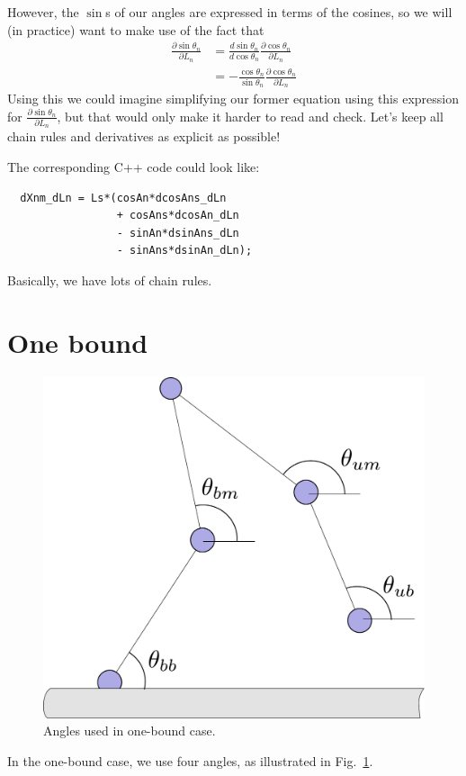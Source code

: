 \documentclass[11pt,twocolumn]{article}
\begin{document}
However, the $\sin$s of our angles are expressed in terms of the
cosines, so we will (in practice) want to make use of the fact that
\begin{align}
  \frac{\partial \sin\theta_{n}}{\partial L_n} &=
  \frac{d \sin\theta_{n}}{d \cos\theta_n}
  \frac{\partial \cos\theta_{n}}{\partial L_n} \\
  &=
  -\frac{\cos\theta_{n}}{\sin\theta_n}
  \frac{\partial \cos\theta_{n}}{\partial L_n}
\end{align}
Using this we could imagine simplifying our former equation using this
expression for $\frac{\partial \sin\theta_{n}}{\partial L_n}$, but
that would only make it harder to read and check.  Let's keep all
chain rules and derivatives as explicit as possible!

The
corresponding C++ code could look like:
\begin{verbatim}
  dXnm_dLn = Ls*(cosAn*dcosAns_dLn
                 + cosAns*dcosAn_dLn
                 - sinAn*dsinAns_dLn
                 - sinAns*dsinAn_dLn);
\end{verbatim}
Basically, we have lots of chain rules.

\section{One bound}

\begin{figure}
  \includegraphics[width=\columnwidth]{../figures/code-onebound}
  \caption{Angles used in one-bound case.}\label{fig:onebound}
\end{figure}

In the one-bound case, we use four angles, as illustrated in
Fig.~\ref{fig:onebound}.
\end{document}
